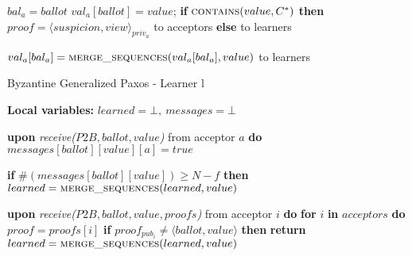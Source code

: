 \begin{algorithm}
\begin{algorithmic}[1]
		\State
		\State $bal_a = ballot$
		\State $val_a[ballot] = value$;
		\State \textbf{if} $\Call{contains}{value, C^*}$ \textbf{then}
		\State \hspace{\algorithmicindent} $proof = \langle suspicion, view \rangle_{priv_a}$
		\State \hspace{\algorithmicindent}  to acceptors
		\State \textbf{else}
		\State \hspace{\algorithmicindent} to learners
		\EndIf
		\EndFunction
		
		\State
		\State $val_a[bal_a] =  \Call{merge\_sequences}{val_a[bal_a], value}$
		\State {} to learners
		\EndIf
		\EndFunction
	\end{algorithmic}
\end{algorithm}

\begin{algorithm}
	\caption{Byzantine Generalized Paxos - Learner l}
	\label{BFT-Learn}
	\textbf{Local variables:} $learned = \bot,\ messages = \bot$ 
	\begin{algorithmic}[1]
		\State \textbf{upon} \textit{receive($P2B, ballot, value$)} from acceptor $a$ \textbf{do}
		\State \hspace{\algorithmicindent} $messages[ballot][value][a] = true$
		
		\State \hspace{\algorithmicindent} \textbf{if} $\#(messages[ballot][value]) \geq N-f$ \textbf{then}
		\State \hspace{\algorithmicindent}\hspace{\algorithmicindent} $learned = \Call{merge\_sequences}{learned, value}$
		
		\State
		\State \textbf{upon} \textit{receive($P2B, ballot, value, proofs$)} from acceptor $i$ \textbf{do}
		\State \hspace{\algorithmicindent} \textbf{for} $i$ \textbf{in} $acceptors$ \textbf{do}
		\State \hspace{\algorithmicindent}\hspace{\algorithmicindent} $proof = proofs[i]$
		\State \hspace{\algorithmicindent}\hspace{\algorithmicindent} \textbf{if} $proof_{pub_i} \neq \langle ballot, value \rangle$ \textbf{then}
		\State \hspace{\algorithmicindent}\hspace{\algorithmicindent}\hspace{\algorithmicindent} \textbf{return}
		\State \hspace{\algorithmicindent} $learned = \Call{merge\_sequences}{learned, value}$
	\end{algorithmic}
\end{algorithm}